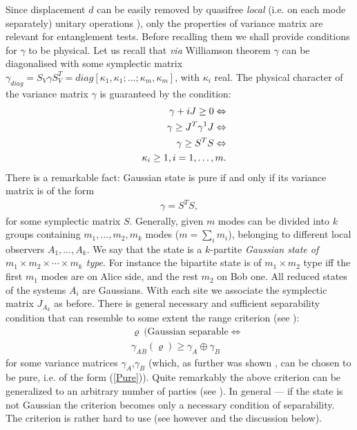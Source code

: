 \documentclass[rmp,12pt,preprint]{revtex4-2}
\begin{document}
Since displacement $d$ can be easily removed by quasifree {\it
local} (i.e. on each mode separately) unitary operations
\cite{DuanGCZ1999-criterion}), only the properties of variance matrix are
relevant for entanglement tests. Before recalling them we shall
provide conditions for $\gamma$ to be physical. Let us recall that
{\it via} Williamson theorem $\gamma$ can be diagonalised with some
symplectic matrix $\gamma_{diag}=S_{V}\gamma
S_{V}^{T}=diag[\kappa_{1},\kappa_{1};\ldots;\kappa_{m},\kappa_{m}]$,
with $\kappa_{i}$ real. The physical character of the variance
matrix $\gamma$ is guaranteed by the condition:
\begin{eqnarray}
&&\gamma+iJ\geq 0\Leftrightarrow \\
\label{1}
&&\gamma\geq J^{T}\gamma^{\-1}J \Leftrightarrow \\
\label{2}
&&\gamma\geq S^{T}S \Leftrightarrow \\
\label{3}
&&\kappa_{i}\geq 1, i=1,\ldots,m.
\label{4}
\end{eqnarray}
There is a remarkable fact\cite{Simon}:
Gaussian state is pure if and only if its variance matrix is of the form
\begin{eqnarray}
\gamma=S^{T}S,
\label{Pure}
\end{eqnarray}
for some symplectic matrix $S$. Generally, given $m$ modes
can be divided into $k$ groups containing $m_{1},\ldots,m_{2},m_{k}$
modes ($m=\sum_{i}m_{i}$), belonging to different local observers
$A_{1},\ldots,A_{k}$. We say that the state is a $k$-partite {\it
Gaussian state of $m_{1} \times m_{2} \times \cdots \times m_{k}$
type}. For instance the bipartite state is  of $m_{1} \times m_{2}$
type iff the first $m_{1}$ modes are on Alice side, and the rest
$m_{2}$ on Bob one. All reduced states of the systems $A_{i}$ are
Gaussians. With each site we associate the symplectic matrix
$J_{A_{k}}$ as before. There is general necessary and sufficient
separability condition that can resemble to some extent the range
criterion (see \cite{WernerWolf}):
\begin{eqnarray}
&&\varrho \ (\text{Gaussian separable} \Leftrightarrow \\
&&\gamma_{AB}(\varrho) \geq \gamma_{A} \oplus \gamma_{B}
\label{GaussMajor}
\end{eqnarray}
for some variance matrices $\gamma_{A}$,$\gamma_{B}$ (which, as
further was shown \cite{Simon1}, can be chosen to be pure, i.e. of the
form (\ref{Pure})). Quite remarkably the above criterion can be
generalized to an arbitrary number of parties (see \cite{Eisert}).  In
general --- if the state is not Gaussian the criterion becomes only a
necessary condition of separability. The criterion is rather hard to
use (see however \cite{WernerWolf} and the discussion below).
\end{document}
